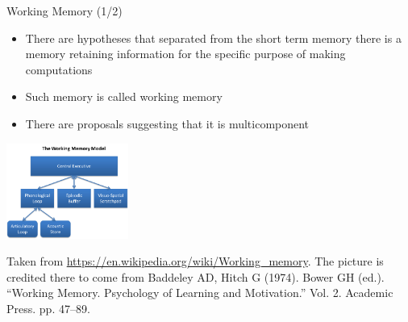 \documentclass{beamer}
\begin{document}
\begin{frame}
{\centerline{Working Memory (1/2)}}
\begin{itemize}
    \item There are hypotheses that separated from the short term memory there is a memory retaining information for the specific purpose of making computations
    \item Such memory is called working memory
    \item There are proposals suggesting that it is multicomponent
\end{itemize} 

\begin{center}

 \includegraphics[width=4cm]{P2023.AIBCCSS.KnowledgeAcquisitionRetentionUse/MulticomponentWorkingMemory.png}
 
 \end{center}

\begin{center}
    \tiny{Taken from \url{https://en.wikipedia.org/wiki/Working_memory}. The picture is credited there to come from Baddeley AD, Hitch G (1974). Bower GH (ed.). ``Working Memory. Psychology of Learning and Motivation.'' Vol. 2. Academic Press. pp. 47–89. }
\end{center}

\end{frame}
\end{document}
